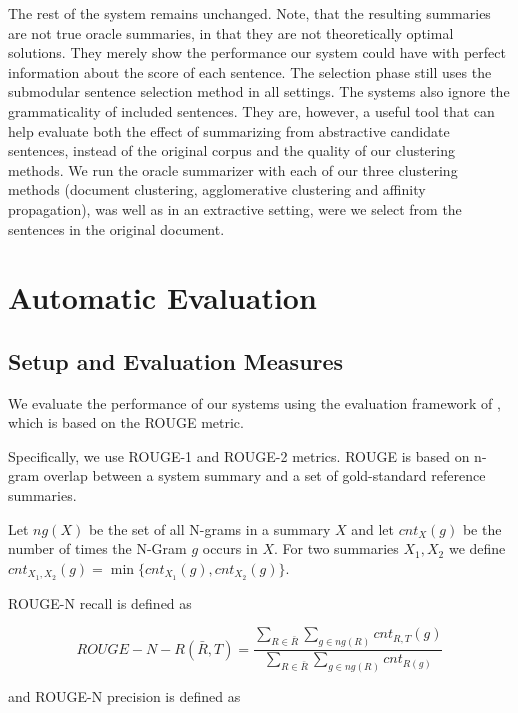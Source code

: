 \documentclass[a4paper,BCOR=10mm]{report}
\numberwithin{lemma}{chapter}
\numberwithin{definition}{chapter}
\begin{document}
The rest of the system remains unchanged. Note, that the resulting summaries are not true oracle summaries, in that they are not theoretically optimal solutions. They merely show the performance our system could have with perfect information about the score of each sentence. The selection phase still uses the submodular sentence selection method in all settings. The systems also ignore the grammaticality of included sentences.
They are, however, a useful tool that can help evaluate both the effect of summarizing from abstractive candidate sentences, instead of the original corpus and the quality of our clustering methods.
We run the oracle summarizer with each of our three clustering methods (document clustering, agglomerative clustering and affinity propagation), was well as in an extractive setting, were we select from the sentences in the original document.

\chapter{Automatic Evaluation} \label{sec:results-auto}

\section{Setup and Evaluation Measures}

We evaluate the performance of our systems using the evaluation framework of \citet{tilse}, which is based on the ROUGE \citep{rouge} metric.

Specifically, we use ROUGE-1 and ROUGE-2 metrics.
ROUGE is based on n-gram overlap between a system summary and a set of gold-standard reference summaries.

Let $\mathit{ng}(X)$ be the set of all N-grams in a summary $X$ and let $\mathit{cnt}_{X}(g)$ be the number of times the N-Gram $g$ occurs in $X$.
For two summaries $X_1, X_2$ we define $\mathit{cnt}_{X_1, X_2}(g) = \min\{  \mathit{cnt}_{X_1}(g),  \mathit{cnt}_{X_2}(g) \}$.

ROUGE-N recall is defined as

\begin{equation}
    \mathit{ROUGE-N-R}(\bar{R}, T) =  \frac{
        \sum_{R \in \bar{R}}
        \sum_{g \in \mathit{ng}(R)}
        \mathit{cnt}_{R,T}(g)
    } {
        \sum_{R \in \bar{R}}
        \sum_{g \in \mathit{ng}(R)}
        \mathit{cnt}_{R(g)}
    }
\end{equation}

and ROUGE-N precision is defined as
\end{document}
